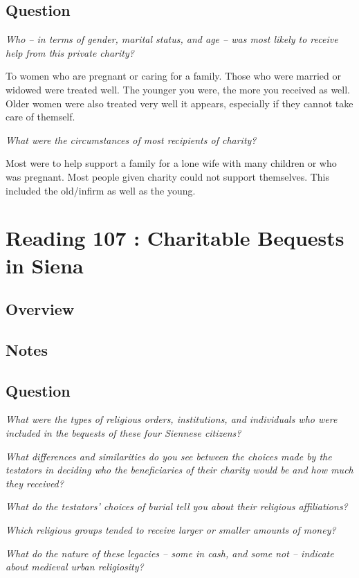 \documentclass[12pt]{article}
\begin{document}
\subsection*{Question}

\textit{Who -- in terms of gender, marital status, and age -- was most likely to receive help from this private charity?}

To women who are pregnant or caring for a family. Those who were married or widowed were treated well. The younger you were, the more you received as well. Older women were also treated very well it appears, especially if they cannot take care of themself.

\textit{What were the circumstances of most recipients of charity?}

Most were to help support a family for a lone wife with many children or who was pregnant.  Most people given charity could not support themselves. This included the old/infirm as well as the young.


\section*{Reading 107 : Charitable Bequests in Siena}

\subsection*{Overview}

\subsection*{Notes}

\subsection*{Question}

\textit{What were the types of religious orders, institutions, and individuals who were included in the bequests of these four Siennese citizens?}

\textit{What differences and similarities do you see between the choices made by the testators in deciding who the beneficiaries of their charity would be and how much they received?}

\textit{What do the testators' choices of burial tell you about their religious affiliations?}

\textit{Which religious groups tended to receive larger or smaller amounts of money?}

\textit{What do the nature of these legacies -- some in cash, and some not -- indicate about medieval urban religiosity?}
\end{document}
